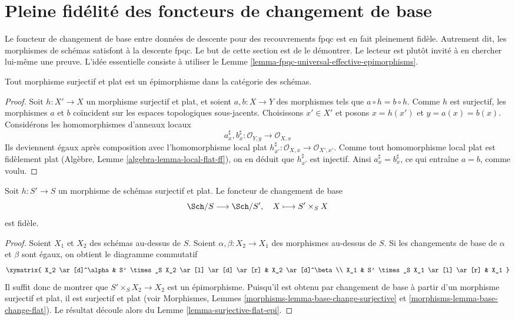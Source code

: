 \section{Pleine fidélité des foncteurs de changement de base}
\label{section-fully-faithful}

\noindent
Le foncteur de changement de base entre données de descente pour des
recouvrements fpqc est en fait pleinement fidèle. Autrement dit, les
morphismes de schémas satisfont à la descente fpqc. Le but de cette section
est de le démontrer. Le lecteur est plutôt invité à en chercher lui-même une
preuve. L'idée essentielle consiste à utiliser le
Lemme \ref{lemma-fpqc-universal-effective-epimorphisms}.

\begin{lemma}
\label{lemma-surjective-flat-epi}
Tout morphisme surjectif et plat est un épimorphisme dans la catégorie des
schémas.
\end{lemma}

\begin{proof}
Soit $h : X' \to X$ un morphisme surjectif et plat, et soient
$a, b : X \to Y$ des morphismes tels que $a \circ h = b \circ h$.
Comme $h$ est surjectif, les morphismes $a$ et $b$ coïncident sur les
espaces topologiques sous-jacents. Choisissons $x' \in X'$ et posons
$x = h(x')$ et $y = a(x) = b(x)$. Considérons les homomorphismes d'anneaux
locaux
$$
a^\sharp_x, b^\sharp_x : \mathcal{O}_{Y, y} \to \mathcal{O}_{X, x}
$$
Ils deviennent égaux après composition avec l'homomorphisme local plat
$h^\sharp_{x'} : \mathcal{O}_{X, x} \to \mathcal{O}_{X', x'}$.
Comme tout homomorphisme local plat est fidèlement plat
(Algèbre, Lemme \ref{algebra-lemma-local-flat-ff}), on en déduit que
$h^\sharp_{x'}$ est injectif. Ainsi $a^\sharp_x = b^\sharp_x$, ce qui
entraîne $a = b$, comme voulu.
\end{proof}

\begin{lemma}
\label{lemma-ff-base-change-faithful}
Soit $h : S' \to S$ un morphisme de schémas surjectif et plat.
Le foncteur de changement de base
$$
\Sch/S \longrightarrow \Sch/S', \quad
X \longmapsto S' \times_S X
$$
est fidèle.
\end{lemma}

\begin{proof}
Soient $X_1$ et $X_2$ des schémas au-dessus de $S$.
Soient $\alpha, \beta : X_2 \to X_1$ des morphismes au-dessus de $S$.
Si les changements de base de $\alpha$ et $\beta$ sont égaux, on obtient le
diagramme commutatif
$$
\xymatrix{
X_2 \ar[d]^\alpha &
S' \times_S X_2 \ar[l] \ar[d] \ar[r] &
X_2 \ar[d]^\beta \\
X_1 &
S' \times_S X_1 \ar[l] \ar[r] &
X_1
}
$$
Il suffit donc de montrer que $S' \times_S X_2 \to X_2$ est un épimorphisme.
Puisqu'il est obtenu par changement de base à partir d'un morphisme surjectif
et plat, il est surjectif et plat (voir
Morphismes, Lemmes \ref{morphisms-lemma-base-change-surjective}
et \ref{morphisms-lemma-base-change-flat}). Le résultat découle alors du
Lemme \ref{lemma-surjective-flat-epi}.
\end{proof}


